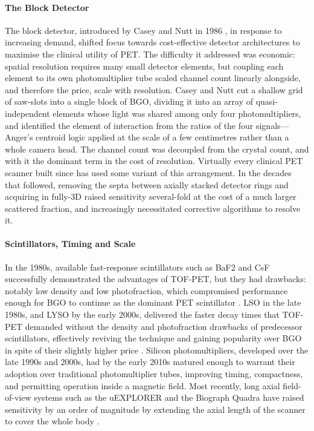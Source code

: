 \paragraph{The Block Detector}
The block detector, introduced by Casey and Nutt in 1986 \cite{Casey1986}, in response to increasing demand, shifted focus towards cost-effective detector architectures to maximise the clinical utility of PET.
The difficulty it addressed was economic: spatial resolution requires many small detector elements, but coupling each element to its own photomultiplier tube scaled channel count linearly alongside, and therefore the price, scale with resolution.
Casey and Nutt cut a shallow grid of saw-slots into a single block of BGO, dividing it into an array of quasi-independent elements whose light was shared among only four photomultipliers, and identified the element of interaction from the ratios of the four signals---Anger's centroid logic applied at the scale of a few centimetres rather than a whole camera head.
The channel count was decoupled from the crystal count, and with it the dominant term in the cost of resolution.
Virtually every clinical PET scanner built since has used some variant of this arrangement.
In the decades that followed, removing the septa between axially stacked detector rings and acquiring in fully-3D raised sensitivity several-fold at the cost of a much larger scattered fraction, and increasingly necessitated corrective algorithms to resolve it.

\paragraph{Scintillators, Timing and Scale}
In the 1980s, available fast-response scintillators such as BaF2 and CsF successfully demonstrated the advantages of TOF-PET, but they had drawbacks: notably low density and low photofraction, which compromised performance enough for BGO to continue as the dominant PET scintillator \cite{Moses2007}.
LSO in the late 1980s, and LYSO by the early 2000s, delivered the faster decay times that TOF-PET demanded without the density and photofraction drawbacks of predecessor scintillators, effectively reviving the technique and gaining popularity over BGO in spite of their slightly higher price \cite{Moses2007}.
Silicon photomultipliers, developed over the late 1990s and 2000s, had by the early 2010s matured enough to warrant their adoption over traditional photomultiplier tubes, improving timing, compactness, and permitting operation inside a magnetic field.
Most recently, long axial field-of-view systems such as the uEXPLORER and the Biograph Quadra have raised sensitivity by an order of magnitude by extending the axial length of the scanner to cover the whole body \cite{Vandenberghe2020, SLHD2021}.

